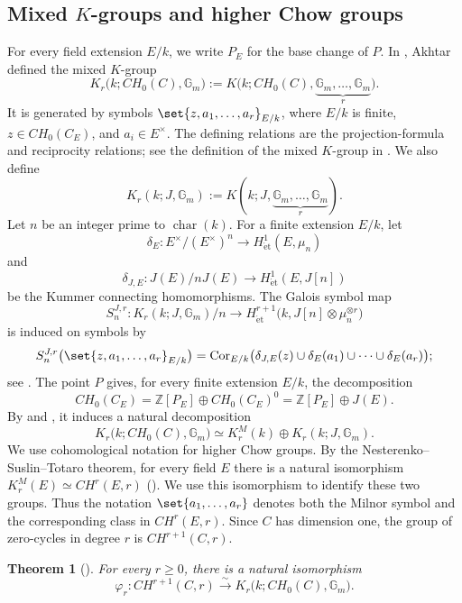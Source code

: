 \documentclass[a4paper,12pt]{amsart}
\numberwithin{equation}{section}
\newtheorem{thm}{Theorem}[section]
\theoremstyle{definition}
\newcommand{\Char}{\operatorname{char}}
\newcommand{\Cor}{\operatorname{Cor}}
\newcommand{\Gm}{\mathbb{G}_{m}}
\newcommand{\Z}{\mathbb{Z}}
\newcommand{\Het}{H_{\mathrm{\acute et}}}
\begin{document}
\subsection{Mixed \texorpdfstring{$K$}{K}-groups and higher Chow groups}
For every field extension $E/k$, we write $P_E$ for the base change of $P$.
In \cite{Akh04}, Akhtar defined the mixed $K$-group
\[
 K_r\bigl(k;CH_0(C),\Gm\bigr)
 :=K\bigl(k;CH_0(C),\underbrace{\Gm,\ldots,\Gm}_{r}\bigr).
\]
It is generated by symbols
$\set{z,a_1,\ldots,a_r}_{E/k}$, where $E/k$ is finite,
$z\in CH_0(C_E)$, and $a_i\in E^\times$.  The defining relations are
the projection-formula and reciprocity relations; see the definition of
the mixed $K$-group in \cite[Section~3]{Akh04}. 
We also define 
\[
K_r(k;J,\Gm) :=  K(k;J,\underbrace{\Gm,\ldots,\Gm}_{r}).
\]
Let $n$ be an integer prime to $\Char(k)$.  For a finite extension $E/k$, let
\[
 \delta_E\colon E^\times/(E^\times)^n\to \Het^1(E,\mu_n)
\]
and
\[
 \delta_{J,E}\colon J(E)/nJ(E)\to \Het^1(E,J[n])
\]
be the Kummer connecting homomorphisms.  The Galois symbol map
\[
 S_n^{J,r}\colon K_r(k;J,\Gm)/n
 \to \Het^{r+1}\bigl(k,J[n]\otimes\mu_n^{\otimes r}\bigr)
\]
is induced on symbols by
\begin{equation}\label{eq:GS}
 S_n^{J,r}\bigl(\set{z,a_1,\ldots,a_r}_{E/k}\bigr)
 =\Cor_{E/k}\bigl(
 \delta_{J,E}(z)\cup\delta_E(a_1)\cup\cdots\cup\delta_E(a_r)
 \bigr);
\end{equation}
see \cite[Lemma~1.6]{Som90}.
The point $P$ gives, for every finite extension $E/k$, the decomposition
\[
 CH_0(C_E)=\Z[P_E]\oplus CH_0(C_E)^0
          =\Z[P_E]\oplus J(E).
\]
By \cite[Corollary~5.4.5]{Akh00} and
\cite[Proposition~1.5]{Som90}, it induces a natural decomposition
\begin{equation}\label{eq:split}
 K_r\bigl(k;CH_0(C),\Gm\bigr)
 \simeq
 K_r^M(k)\oplus
 K_r(k;J,\Gm).
\end{equation}
We use cohomological notation for higher Chow groups.  By the
Nesterenko--Suslin--Totaro theorem, for every field $E$ there is a
natural isomorphism $K_r^M(E)\simeq CH^r(E,r)$ (\cite{NS90,Tot92}).  
We use this isomorphism to identify these two
groups.  Thus the notation $\set{a_1,\ldots,a_r}$ denotes both the
Milnor symbol and the corresponding class in $CH^r(E,r)$.  Since $C$
has dimension one, the group of zero-cycles in degree $r$ is
$CH^{r+1}(C,r)$.

\begin{thm}[{\cite[Theorem~6.1]{Akh04}}]\label{thm:Akh}
For every $r\geq0$, there is a natural isomorphism
\begin{equation}\label{eq:Akh}
 \varphi_r\colon
 CH^{r+1}(C,r)
 \overset{\sim}{\to}
 K_r\bigl(k;CH_0(C),\Gm\bigr).
\end{equation}
\end{thm}
\end{document}
